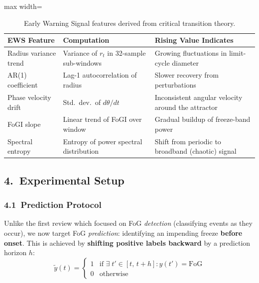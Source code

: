 \documentclass[12pt,a4paper]{article}
\begin{document}
\begin{table}[ht]
\centering
\renewcommand{\arraystretch}{1.3}
\begin{adjustbox}{max width=\textwidth}
\begin{tabular}{p{3.5cm} p{5.0cm} p{5.5cm}}
\toprule
\textbf{EWS Feature} & \textbf{Computation} & \textbf{Rising Value Indicates} \\
\midrule
Radius variance trend & Variance of $r_t$ in 32-sample sub-windows &
  Growing fluctuations in limit-cycle diameter \\
AR(1) coefficient & Lag-1 autocorrelation of radius &
  Slower recovery from perturbations \\
Phase velocity drift & Std.\ dev.\ of $d\theta/dt$ &
  Inconsistent angular velocity around the attractor \\
FoGI slope & Linear trend of FoGI over window &
  Gradual buildup of freeze-band power \\
Spectral entropy & Entropy of power spectral distribution &
  Shift from periodic to broadband (chaotic) signal \\
\bottomrule
\end{tabular}
\end{adjustbox}
\caption{Early Warning Signal features derived from critical transition theory.}
\label{tab:ews_features}
\end{table}

\newpage
\subsection*{4.\ Experimental Setup}

\subsubsection*{4.1\ Prediction Protocol}

Unlike the first review which focused on FoG \emph{detection} (classifying events as they occur),
we now target FoG \emph{prediction}: identifying an impending freeze \textbf{before onset}. This
is achieved by \textbf{shifting positive labels backward} by a prediction horizon $h$:
\begin{equation}
  \tilde{y}(t) =
  \begin{cases}
    1 & \text{if } \exists\; t' \in [t,\, t+h]: y(t')=\text{FoG} \\
    0 & \text{otherwise}
  \end{cases}
\end{equation}
\end{document}
